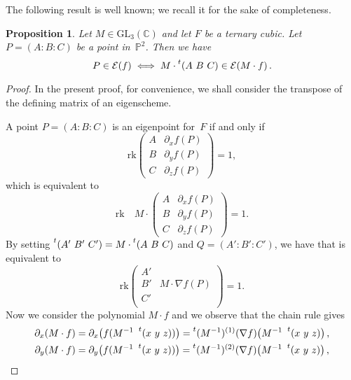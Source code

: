 \documentclass{amsart}
\theoremstyle{plain}
\newtheorem{prop}[lemma]{Proposition}
\theoremstyle{definition}
\newcommand{\C}{\mathbb{C}}
\newcommand{\p}{\mathbb{P}}
\newcommand{\de}{\partial}
\newcommand{\Eig}[1]{\mathcal{E}\!\left( {#1} \right)}
\newcommand{\rk}{\ensuremath{\mathrm{rk}}}
\begin{document}
The following result is well known; we recall it for the sake of completeness.

\begin{prop}
 Let $M \in \mathrm{GL}_3(\C)$ and let $F$ be a ternary cubic.
 Let $P = (A: B: C)$ be a point in~$\p^2$.
 Then we have
 \[
  P \in \Eig{f} \iff M \cdot \prescript{t} {}(A \ B \ C) \in \Eig{M \cdot f}.
 \]
\end{prop}
\begin{proof}
In the present proof,
for convenience, we shall consider the transpose of the defining matrix of an eigenscheme.

A point $P = (A: B: C)$ is an eigenpoint for~$F$ if and only if
\begin{equation*}
  \mathrm{rk}  \begin{pmatrix}
    A & \de_x f(P) \\
    B & \de_y f(P)  \\
    C & \de_z f(P)
    \end{pmatrix}=1,
\end{equation*}
which is equivalent to
\begin{equation}
\label{eq:def_matrix_M}
    \mathrm{rk} \quad  M  \cdot \begin{pmatrix}
    A & \de_x f(P) \\
    B & \de_y f(P)  \\
    C & \de_z f(P)
    \end{pmatrix}
    =1.
\end{equation}
By setting $\prescript{t} {}(A' \ B' \ C' )= M \cdot \prescript{t} {}(A \ B \ C) $ and $Q=(A':B':C')$, we have that 
is equivalent to
%
\begin{equation}
\label{eq:transformed}
  \rk
  \begin{pmatrix}
    A' &  \\
    B' & M \cdot \nabla f (P) \\
    C' & \\
  \end{pmatrix}=1.
\end{equation}
%
Now we consider the polynomial $M \cdot f$ and we observe that the chain rule gives
%
\begin{gather*}
\partial_x (M\cdot f) = \partial_x \bigl( f(M^{-1}  \ \prescript{t} {} (x \ y \ z)) \bigr) = \prescript{t} {}(M^{-1})^{(1)}(\nabla f) \bigl( M^{-1}\   \prescript{t} {} (x \ y \ z) \bigr) \,, \\
\partial_y (M\cdot f) = \partial_y \bigl( f(M^{-1}  \ \prescript{t} {} (x \ y \ z)) \bigr) = \prescript{t} {}(M^{-1})^{(2)}(\nabla f) \bigl( M^{-1}\   \prescript{t} {} (x \ y \ z) \bigr) \,, \\

\end{gather*}
\end{proof}
\end{document}
